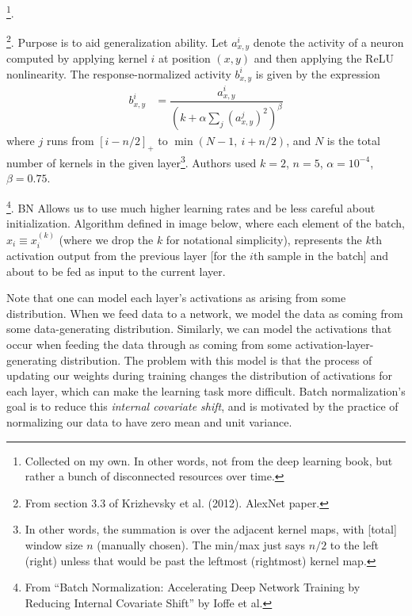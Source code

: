 \documentclass[11pt]{article}
\begin{document}
\myspace
\p {}\footnote{Collected on my own. In other words, not from the deep learning book, but rather a bunch of disconnected resources over time.}. 
\begin{compactitem}
	\item {}\footnote{From section 3.3 of Krizhevsky et al. (2012). AlexNet paper.}. Purpose is to aid generalization ability. Let $a^i_{x, y}$ denote the activity of a neuron computed by applying kernel $i$ at position $(x, y)$ and then applying the ReLU nonlinearity. The response-normalized activity $b^i_{x,y}$ is given by the expression
	\begin{align}
		b^i_{x,y} &= \dfrac{a^i_{x,y}}{
			\left(k + \alpha \sum_j \left(a^j_{x,y} \right)^2	 \right)^{\beta}
		}
	\end{align}
	where $j$ runs from $\left[i - n/2\right]_+$ to $\min(N-1, ~ i + n/2)$, and $N$ is the total number of kernels in the given layer\footnote{In other words, the summation is over the adjacent kernel maps, with [total] window size $n$ (manually chosen). The min/max just says $n/2$ to the left (right) unless that would be past the leftmost (rightmost) kernel map.}. Authors used $k = 2$, $n = 5$, $\alpha = 10^{-4}$, $\beta = 0.75$. 
	
	\item {}\footnote{From ``Batch Normalization: Accelerating Deep Network Training by Reducing Internal Covariate Shift'' by Ioffe et al.}. BN Allows us to use much higher learning rates and be less careful about initialization. Algorithm defined in image below, where each element of the batch, $x_i \equiv x_i^{(k)}$ (where we drop the $k$ for notational simplicity), represents the $k$th activation output from the previous layer [for the $i$th sample in the batch] and about to be fed as input to the current layer.
	
	 Note that one can model each layer's activations as arising from some distribution. When we feed data to a network, we model the data as coming from some data-generating distribution. Similarly, we can model the activations that occur when feeding the data through as coming from some activation-layer-generating distribution. The problem with this model is that the process of updating our weights during training changes the distribution of activations for each layer, which can make the learning task more difficult. Batch normalization's goal is to reduce this \textit{internal covariate shift}, and is motivated by the practice of normalizing our data to have zero mean and unit variance.
	
\end{compactitem}
\end{document}
